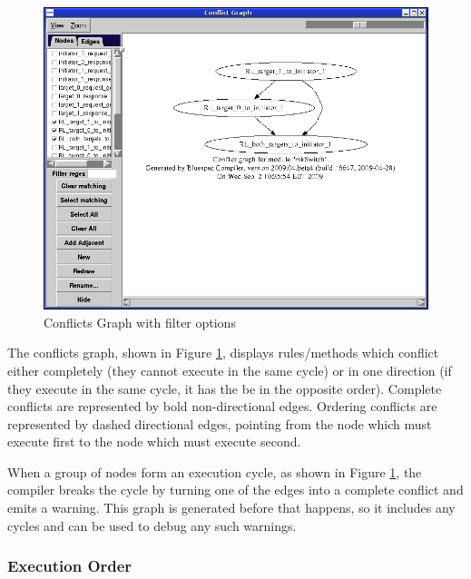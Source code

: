 \documentclass{article}
\begin{document}
\begin{figure}[ht]
\begin{center}
\includegraphics[width = 3 in]{figures/conflictgraph}
\caption{Conflicts Graph with filter options}
\label{fig-conflictgraph}
\end{center}
\end{figure}

The conflicts graph, shown in Figure \ref{fig-conflictgraph},  displays rules/methods which conflict either completely
(they cannot execute in the same cycle) or  in one direction (if they execute in the
same cycle, it has the be in the opposite order).  Complete conflicts are
represented by bold non-directional edges. Ordering conflicts are
represented by dashed directional edges, pointing from the node which must
execute first to the node which must execute second.


When a group of nodes form an execution cycle, as shown in Figure \ref{fig-conflictgraph}, the compiler breaks the cycle by turning one of the edges into
a complete conflict and emits a warning.  This graph is generated before
that happens, so it includes any cycles and can be used to debug any such
warnings.


\subsubsection{Execution Order}
\end{document}
